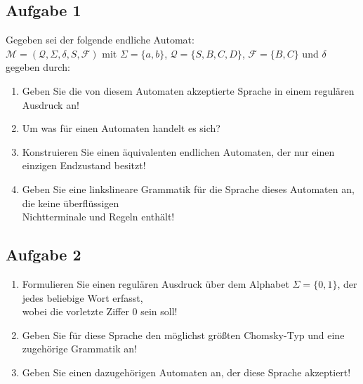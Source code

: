 \documentclass[10pt,oneside,onecolumn,a4paper,german,titlepage]{article}
\begin{document}
\subsection*{Aufgabe 1}
Gegeben sei der folgende endliche Automat:\\
$\mathcal{M} = (\mathcal{Q},\Sigma,\delta,S,\mathcal{F})$ mit
$\Sigma = \{a,b\}$, $\mathcal{Q} = \{S,B,C,D\}$, $\mathcal{F} = \{B,C\}$
und $\delta$ gegeben durch:
\begin{center}
\end{center}
\begin{enumerate}
\item Geben Sie die von diesem Automaten akzeptierte Sprache in einem regulären
Ausdruck an!
\item Um was für einen Automaten handelt es sich?
\item Konstruieren Sie einen äquivalenten endlichen Automaten, der nur einen
einzigen Endzustand besitzt!
\item Geben Sie eine linkslineare Grammatik für die Sprache dieses Automaten an,
die keine überflüssigen\\
Nichtterminale und Regeln enthält!
\end{enumerate}

\subsection*{Aufgabe 2}
\begin{enumerate}
\item Formulieren Sie einen regulären Ausdruck über dem Alphabet $\Sigma =
\{0,1\}$, der jedes beliebige Wort erfasst,\\
wobei die vorletzte Ziffer $0$ sein soll!
\item Geben Sie für diese Sprache den möglichst größten Chomsky-Typ und eine
zugehörige Grammatik an!
\item Geben Sie einen dazugehörigen Automaten an, der diese Sprache akzeptiert!
\end{enumerate}
\end{document}

